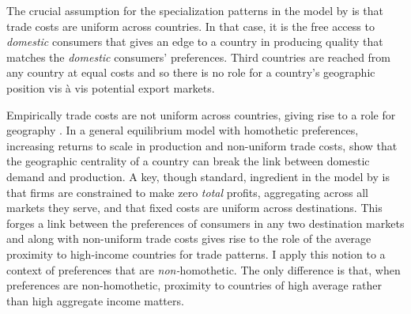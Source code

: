\documentclass[12pt,a4paper,oneside,times]{article}   	%
\begin{document}
The crucial assumption for the specialization patterns in the model by \cite{Fajgelbaum2011} is that trade costs are uniform across countries. In that case, it is the free access to \emph{domestic} consumers that gives an edge to a country in producing quality that matches the \emph{domestic} consumers' preferences. Third countries are reached from any country at equal costs and so there is no role for a country's geographic position vis {\`a} vis potential export markets.

Empirically trade costs are not uniform across countries, giving rise to a role for geography \citep{Davis2003,Matsuyama2017}. In a general equilibrium model with  homothetic preferences, increasing returns to scale in production and non-uniform trade costs, \cite{Behrens2009} show that the geographic centrality of a country can break the link between domestic demand and production. A key, though standard, ingredient in  the model by \cite{Behrens2009} is that firms are constrained to make zero \emph{total} profits, aggregating across all markets they serve, and that fixed costs are uniform across destinations. This forges a link between the preferences of consumers in any two destination markets and along with non-uniform trade costs gives rise to the role of the average proximity to high-income countries for trade patterns.  I apply this notion to a context of preferences that are \emph{non-}homothetic. The only difference is that, when preferences are non-homothetic, proximity to countries of high average rather than high aggregate income matters. 





  
\end{document}
